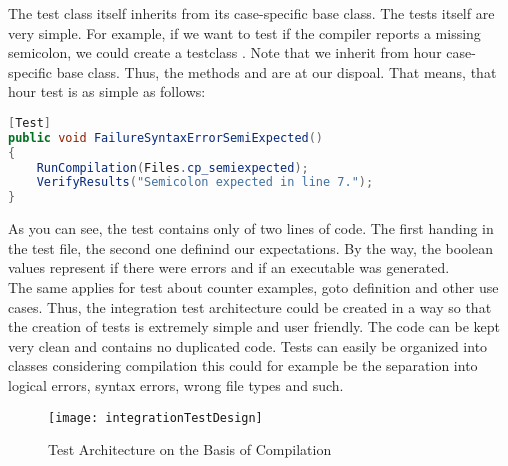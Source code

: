 The test class itself inherits from its case-specific base class. The tests itself are very simple. For example, if we want to test if the compiler reports a missing semicolon, we could create a testclass . Note that we inherit from hour case-specific base class. Thus, the methods  and are at our dispoal. That means, that hour test is as simple as follows:
\begin{lstlisting}[language=csharp, caption={Sample Test for Missing Semicolon}, captionpos=b, label={lst:demoTest}]
[Test]
public void FailureSyntaxErrorSemiExpected()
{
    RunCompilation(Files.cp_semiexpected);
    VerifyResults("Semicolon expected in line 7.");
}
\end{lstlisting}
As you can see, the test contains only of two lines of code. The first handing in the test file, the second one definind our expectations. By the way, the boolean values represent if there were errors and if an executable was generated.\\
The same applies for test about counter examples, goto definition and other use cases. Thus, the integration test architecture could be created in a way so that the creation of tests is extremely simple and user friendly. The code can be kept very clean and contains no duplicated code. Tests can easily be organized into classes \textendash{} considering compilation this could for example be the separation into logical errors, syntax errors, wrong file types and such.

\begin{figure}[h]
    \centering
    \texttt{[image: integrationTestDesign]}
    \caption{Test Architecture on the Basis of Compilation}
    \label{fig:testArchitecture}
\end{figure}
